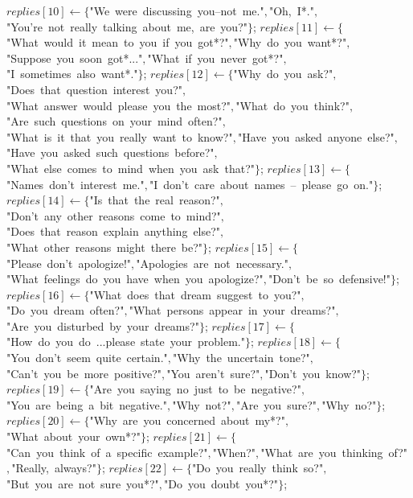 \documentclass[a4paper,10pt]{article}
\begin{document}
\begin{algorithm}
\begin{algorithmic}[5]
  \STATE \(replies[10]\gets\{\)"{}We\ were\ discussing\ you--not\ me."{}\(,\)"{}Oh,\ I*."{}\(,\)"{}You'{}re\ not\ really\ talking\ about\ me,\ are\ you?"{}\(\}\);
  \STATE \(replies[11]\gets\{\)"{}What\ would\ it\ mean\ to\ you\ if\ you\ got*?"{}\(,\)"{}Why\ do\ you\ want*?"{}\(,\)"{}Suppose\ you\ soon\ got*..."{}\(,\)"{}What\ if\ you\ never\ got*?"{}\(,\)"{}I\ sometimes\ also\ want*."{}\(\}\);
  \STATE \(replies[12]\gets\{\)"{}Why\ do\ you\ ask?"{}\(,\)"{}Does\ that\ question\ interest\ you?"{}\(,\)"{}What\ answer\ would\ please\ you\ the\ most?"{}\(,\)"{}What\ do\ you\ think?"{}\(,\)"{}Are\ such\ questions\ on\ your\ mind\ often?"{}\(,\)"{}What\ is\ it\ that\ you\ really\ want\ to\ know?"{}\(,\)"{}Have\ you\ asked\ anyone\ else?"{}\(,\)"{}Have\ you\ asked\ such\ questions\ before?"{}\(,\)"{}What\ else\ comes\ to\ mind\ when\ you\ ask\ that?"{}\(\}\);
  \STATE \(replies[13]\gets\{\)"{}Names\ don'{}t\ interest\ me."{}\(,\)"{}I\ don'{}t\ care\ about\ names\ --\ please\ go\ on."{}\(\}\);
  \STATE \(replies[14]\gets\{\)"{}Is\ that\ the\ real\ reason?"{}\(,\)"{}Don'{}t\ any\ other\ reasons\ come\ to\ mind?"{}\(,\)"{}Does\ that\ reason\ explain\ anything\ else?"{}\(,\)"{}What\ other\ reasons\ might\ there\ be?"{}\(\}\);
  \STATE \(replies[15]\gets\{\)"{}Please\ don'{}t\ apologize!"{}\(,\)"{}Apologies\ are\ not\ necessary."{}\(,\)"{}What\ feelings\ do\ you\ have\ when\ you\ apologize?"{}\(,\)"{}Don'{}t\ be\ so\ defensive!"{}\(\}\);
  \STATE \(replies[16]\gets\{\)"{}What\ does\ that\ dream\ suggest\ to\ you?"{}\(,\)"{}Do\ you\ dream\ often?"{}\(,\)"{}What\ persons\ appear\ in\ your\ dreams?"{}\(,\)"{}Are\ you\ disturbed\ by\ your\ dreams?"{}\(\}\);
  \STATE \(replies[17]\gets\{\)"{}How\ do\ you\ do\ ...please\ state\ your\ problem."{}\(\}\);
  \STATE \(replies[18]\gets\{\)"{}You\ don'{}t\ seem\ quite\ certain."{}\(,\)"{}Why\ the\ uncertain\ tone?"{}\(,\)"{}Can'{}t\ you\ be\ more\ positive?"{}\(,\)"{}You\ aren'{}t\ sure?"{}\(,\)"{}Don'{}t\ you\ know?"{}\(\}\);
  \STATE \(replies[19]\gets\{\)"{}Are\ you\ saying\ no\ just\ to\ be\ negative?"{}\(,\)"{}You\ are\ being\ a\ bit\ negative."{}\(,\)"{}Why\ not?"{}\(,\)"{}Are\ you\ sure?"{}\(,\)"{}Why\ no?"{}\(\}\);
  \STATE \(replies[20]\gets\{\)"{}Why\ are\ you\ concerned\ about\ my*?"{}\(,\)"{}What\ about\ your\ own*?"{}\(\}\);
  \STATE \(replies[21]\gets\{\)"{}Can\ you\ think\ of\ a\ specific\ example?"{}\(,\)"{}When?"{}\(,\)"{}What\ are\ you\ thinking\ of?"{}\(,\)"{}Really,\ always?"{}\(\}\);
  \STATE \(replies[22]\gets\{\)"{}Do\ you\ really\ think\ so?"{}\(,\)"{}But\ you\ are\ not\ sure\ you*?"{}\(,\)"{}Do\ you\ doubt\ you*?"{}\(\}\);

\end{algorithmic}
\end{algorithm}
\end{document}
